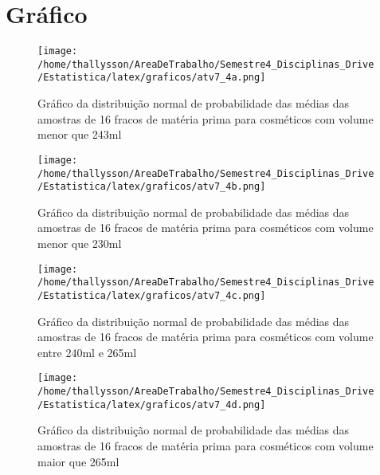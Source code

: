\documentclass{article}
\begin{document}
	
	\section*{Gráfico}
	
	
	\begin{figure}[H]
		\centering
		\texttt{[image: /home/thallysson/AreaDeTrabalho/Semestre4\_Disciplinas\_Drive/Estatistica/latex/graficos/atv7\_4a.png]}
		\caption{Gráfico da distribuição normal de probabilidade das médias das amostras de 16 fracos de matéria prima para cosméticos com volume menor que 243ml}
		\label{fig:grafico_a}
	\end{figure}
	
	\begin{figure}[H]
		\centering
		\texttt{[image: /home/thallysson/AreaDeTrabalho/Semestre4\_Disciplinas\_Drive/Estatistica/latex/graficos/atv7\_4b.png]}
		\caption{Gráfico da distribuição normal de probabilidade das médias das amostras de 16 fracos de matéria prima para cosméticos com volume menor que 230ml}
		\label{fig:grafico_b}
	\end{figure}
	
	\begin{figure}[H]
		\centering
		\texttt{[image: /home/thallysson/AreaDeTrabalho/Semestre4\_Disciplinas\_Drive/Estatistica/latex/graficos/atv7\_4c.png]}
		\caption{Gráfico da distribuição normal de probabilidade das médias das amostras de 16 fracos de matéria prima para cosméticos com volume entre 240ml e 265ml}
		\label{fig:grafico_c}
	\end{figure}
	
	\begin{figure}[H]
		\centering
		\texttt{[image: /home/thallysson/AreaDeTrabalho/Semestre4\_Disciplinas\_Drive/Estatistica/latex/graficos/atv7\_4d.png]}
		\caption{Gráfico da distribuição normal de probabilidade das médias das amostras de 16 fracos de matéria prima para cosméticos com volume maior que 265ml}
		\label{fig:grafico_d}
	\end{figure}
	
	
	
	
	
\end{document}

